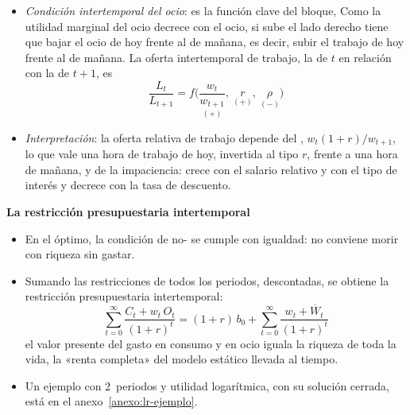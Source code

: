 \documentclass[11pt]{article}
\begin{document}
\begin{itemize}
  \begin{itemize}
  \item La (1) es la tangencia del modelo estático \eqref{eq:oferta-tangencia}, $\mathrm{RMS}_{OC}=w_t$, en cada periodo.\footnote{La condición intratemporal se cumple en cada periodo porque la utilidad es separable; con hábitos o con una utilidad no separable entre periodos deja de cumplirse\nocite{Cahuc2014Labor}.}
  \item La (2) es la regla del consumo intertemporal : el consumo crece si el mercado paga más que la impaciencia, $r>\rho$.
  \item La (3) es la que interesa para la oferta de trabajo. A la izquierda está la relación marginal de sustitución entre el ocio de hoy y el de mañana; a la derecha, su precio relativo: una hora de ocio hoy cuesta $w_t$, que invertido rendiría $(1+r)\,w_t$ mañana, y una hora de ocio mañana cuesta $w_{t+1}$.
  \end{itemize}
\item \emph{Condición intertemporal del ocio}: es la función clave del bloque,
  Como la utilidad marginal del ocio decrece con el ocio, si sube el lado derecho tiene que bajar el ocio de hoy frente al de mañana, es decir, subir el trabajo de hoy frente al de mañana. La oferta intertemporal de trabajo, la de $t$ en relación con la de $t+1$, es
  \[
  \frac{L_t}{L_{t+1}}=f\Big(\underset{(+)}{\frac{w_t}{w_{t+1}}},\ \underset{(+)}{r},\ \underset{(-)}{\rho}\Big)
  \]
\item \emph{Interpretación}: la oferta relativa de trabajo depende del , $w_t(1+r)/w_{t+1}$, lo que vale una hora de trabajo de hoy, invertida al tipo $r$, frente a una hora de mañana, y de la impaciencia: crece con el salario relativo y con el tipo de interés y decrece con la tasa de descuento.
\end{itemize}

\begin{anotaciones}
\textbf{La restricción presupuestaria intertemporal}

\begin{itemize}
\item En el óptimo, la condición de no- se cumple con igualdad: no conviene morir con riqueza sin gastar.
\item Sumando las restricciones de todos los periodos, descontadas, se obtiene la restricción presupuestaria intertemporal:
  \[
  \sum_{t=0}^{\infty}\frac{C_t+w_t\,O_t}{(1+r)^{t}}=(1+r)\,b_0+\sum_{t=0}^{\infty}\frac{w_t+\overline{W}_t}{(1+r)^{t}}
  \]
  el valor presente del gasto en consumo y en ocio iguala la riqueza de toda la vida, la «renta completa» del modelo estático llevada al tiempo.
\item Un ejemplo con 2~periodos y utilidad logarítmica, con su solución cerrada, está en el anexo~\ref{anexo:lr-ejemplo}.
\end{itemize}
\end{anotaciones}
\end{document}
